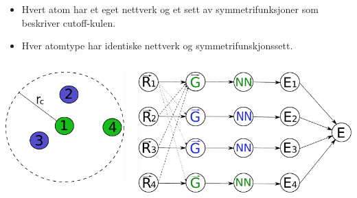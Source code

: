 \documentclass{beamer}
\begin{document}
\begin{frame}

\begin{itemize}
 \item Hvert atom har et eget nettverk og et sett av symmetrifunksjoner som beskriver cutoff-kulen. 
 \item Hver atomtype har identiske nettverk og symmetrifunskjonssett. 
\end{itemize}

\begin{columns}[c] %
  \begin{column}[c]{0.35\linewidth} %
   \centering
   \includegraphics[width=\linewidth]{../Figures/Presentation/cutoffSphere.pdf}
  \end{column}
  \begin{column}[c]{0.65\linewidth} %
   \includegraphics[width=\linewidth]{../Figures/Presentation/BehlerParrinello.pdf}
  \end{column}
\end{columns}

\end{frame}
\end{document}
